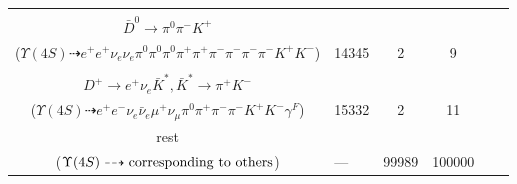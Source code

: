 \documentclass[landscape]{article}
\newcounter{rownumbers}
\newcommand\rn{\stepcounter{rownumbers}\arabic{rownumbers}}
\newcommand{\EOLP}{\\ \hline} %
\newcommand{\topoTags}[1]{#1} %
\begin{document}
\begin{longtable}{clcccc}
\rn & \makecell[l]{ $ 
\Upsilon(4S) \rightarrow B^{0} \bar{B}^{0} ,
B^{0} \rightarrow e^{+} \nu_{e} D^{*-} ,
\bar{B}^{0} \rightarrow \pi^{0} \pi^{-} \omega D^{+} ,
D^{*-} \rightarrow \pi^{-} \bar{D}^{0} ,
\omega \rightarrow \pi^{0} \pi^{+} \pi^{-} ,
D^{+} \rightarrow e^{+} \nu_{e} \pi^{+} K^{-} ,
$ \\ $
\bar{D}^{0} \rightarrow \pi^{0} \pi^{-} K^{+} 
$ \\ ($
\Upsilon(4S) \dashrightarrow e^{+} e^{+} \nu_{e} \nu_{e} \pi^{0} \pi^{0} \pi^{0} \pi^{+} \pi^{+} \pi^{-} \pi^{-} \pi^{-} \pi^{-} K^{+} K^{-} 
$) } & \topoTags{14345 & }2 & 9 \EOLP

\rn & \makecell[l]{ $ 
\Upsilon(4S) \rightarrow B^{0} \bar{B}^{0} ,
B^{0} \rightarrow \mu^{+} \nu_{\mu} D^{*-} ,
\bar{B}^{0} \rightarrow e^{-} \bar{\nu}_{e} D^{*+} \gamma^{F} ,
D^{*-} \rightarrow \pi^{-} \bar{D}^{0} ,
D^{*+} \rightarrow \pi^{0} D^{+} ,
\bar{D}^{0} \rightarrow \pi^{-} K^{+} ,
$ \\ $
D^{+} \rightarrow e^{+} \nu_{e} \bar{K}^{*} ,
\bar{K}^{*} \rightarrow \pi^{+} K^{-} 
$ \\ ($
\Upsilon(4S) \dashrightarrow e^{+} e^{-} \nu_{e} \bar{\nu}_{e} \mu^{+} \nu_{\mu} \pi^{0} \pi^{+} \pi^{-} \pi^{-} K^{+} K^{-} \gamma^{F} 
$) } & \topoTags{15332 & }2 & 11 \EOLP

rest & \makecell[l]{ $ 
\Upsilon(4S) \rightarrow \rm{others \  (99980 \  in \  total)}
$ \\ ($
\Upsilon(4S) \dashrightarrow \rm{corresponding\ to\ others}
$) } & \topoTags{--- & }99989 & 100000 \\ \hline

\end{longtable}
\end{document}
